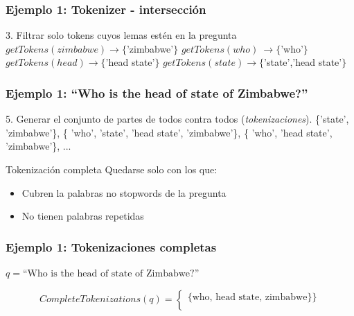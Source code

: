 \begin{frame}[t]
\frametitle{Ejemplo 1: Tokenizer - intersección}
3. Filtrar solo tokens cuyos lemas estén en la pregunta\newline
  \Large{
    $getTokens(zimbabwe) \rightarrow \{$'zimbabwe'$\}$\newline
    $getTokens(who)\ \rightarrow \{$'who'$\}$\newline
    $getTokens(head) \rightarrow \{$'head state'$\}$\newline
    $getTokens(state) \rightarrow  \{$'state','head state'$\}$
}
\end{frame}

\begin{frame}[t]
\frametitle{Ejemplo 1: ``Who is the head of state of Zimbabwe?''}
 5. Generar el conjunto de partes de todos contra todos (\textit{tokenizaciones}).\newline
  \Large{
      \{'state', 'zimbabwe'\},\newline
      \{ 'who', '{\color{red}state}', 'head {\color{red}state}', 'zimbabwe'\},\newline
      \{ 'who', 'head state', 'zimbabwe'\},\newline
      ...
  }\newline

\normalsize{
\begin{block}{Tokenización completa}  
  Quedarse solo con los que:
  \begin{itemize}
    \item Cubren la palabras no stopwords de la pregunta
    \item No tienen palabras {\color{red}repetidas}
  \end{itemize}
  
\end{block}
}
\end{frame}

\begin{frame}
\frametitle{Ejemplo 1: Tokenizaciones completas}

\begin{center}

$q = \text{``Who is the head of state of Zimbabwe?''}$
\end{center}
 \begin{equation*}
    CompleteTokenizations(q) = \begin{cases}
               \{\text{who, head state, zimbabwe}\}\} \\
           \end{cases}
\end{equation*}

\end{frame}

